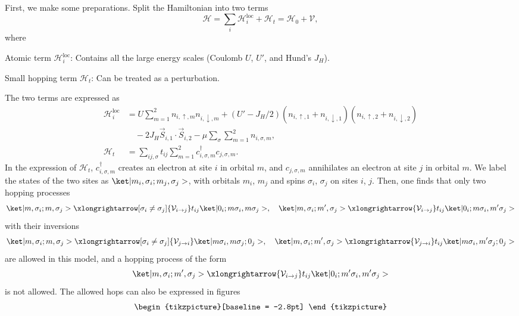 \begin{solution}
  First, we make some preparations. Split the Hamiltonian into two terms
  \[
    \mathcal H = \sum_i \mathcal H_i^\text{loc} + \mathcal H_t
  = \mathcal H_0 + \mathcal V,
  \]
  where
  \begin{enumext}
    \item Atomic term $\mathcal H_i^\text{loc}$:
    Contains all the large energy scales (Coulomb $U$, $U'$, and Hund's $J_H$).
    \item Small hopping term $\mathcal H_t$: Can be treated as a perturbation.
  \end{enumext}
  The two terms are expressed as
  \begin{align*}
    \mathcal H_i^\text{loc} &
  = U\sum_{m=1}^2
    n_{i,\uparrow,m} n_{i,\downarrow,m}
  + (U' - J_H/2) (n_{i,\uparrow,1} + n_{i,\downarrow,1})
    (n_{i,\uparrow,2} + n_{i,\downarrow,2})\\
  & \quad - 2J_H \vec S_{i,1} \cdot \vec S_{i,2}
  - \mu \sum_{\sigma} \sum_{m=1}^2 n_{i,\sigma,m},\\
    \mathcal H_t & = \sum_{ij,\sigma} t_{ij} \sum_{m=1}^2
    c_{i,\sigma,m}^\dagger c_{j,\sigma,m}.
  \end{align*}
  In the expression of $\mathcal H_t$,
  $c_{i,\sigma,m}^\dagger$ creates an electron at site $i$ in orbital $m$,
  and $c_{j,\sigma,m}$ annihilates an electron at site $j$ in orbital $m$.
  We label the states of the two sites as $\ket|m_i,\sigma_i; m_j,\sigma_j>$,
  with orbitals $m_i$, $m_j$ and spins $\sigma_i$, $\sigma_j$ on
  sites $i$, $j$. Then, one finds that only two hopping processes
  \[
    \ket|m,\sigma_i;m,\sigma_j>
    \xlongrightarrow[\sigma_i\neq\sigma_j]{\mathcal V_{i\to j}}
    t_{ij} \ket|0_i;m\sigma_i,m\sigma_j>,\quad
    \ket|m,\sigma_i;m',\sigma_j> \xlongrightarrow{\mathcal V_{i\to j}}
    t_{ij} \ket|0_i;m\sigma_i,m'\sigma_j>
  \]
  with their inversions
  \[
    \ket|m,\sigma_i;m,\sigma_j>
    \xlongrightarrow[\sigma_i\neq\sigma_j]{\mathcal V_{j\to i}}
    \ket|m\sigma_i,m\sigma_j;0_j>,\quad
    \ket|m,\sigma_i;m',\sigma_j> \xlongrightarrow{\mathcal V_{j\to i}}
    t_{ij} \ket|m\sigma_i,m'\sigma_j;0_j>
  \]
  are allowed in this model, and a hopping process of the form
  \[
    \ket|m,\sigma_i;m',\sigma_j> \xlongrightarrow{\mathcal V_{i\to j}}
    t_{ij} \ket|0_i;m'\sigma_i,m'\sigma_j>
  \]
  is not allowed. The allowed hops can also be expressed in figures
  \begin{gather}
    \begin{tikzpicture}[baseline = -2.8pt]

\end{tikzpicture}
\end{gather}
\end{solution}
